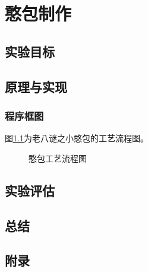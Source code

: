 \chapter{憨包制作}
\section{实验目标}
\section{原理与实现}
\subsection{程序框图}
图\ref{FC1}为老八谜之小憨包的工艺流程图。
\begin{figure}[htbp]
    \centering
    \resizebox{0.5\textwidth}{!}{%
    
    }%
    \caption{憨包工艺流程图}
    \label{FC1}
\end{figure}
\section{实验评估}
\section{总结}
\section{附录}
